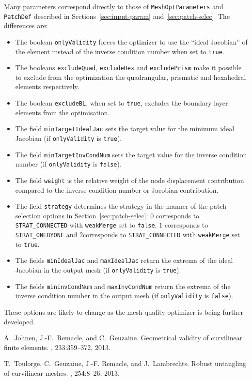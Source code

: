 \documentclass[12pt,a4paper,a4wide]{article}
\begin{document}
Many parameters correspond directly to those of
\texttt{MeshOptParameters} and \texttt{PatchDef} described in
Sections~\ref{sec:input-param} and~\ref{sec:patch-selec}. The
differences are:
\begin{itemize}
\item The boolean \texttt{onlyValidity} forces the optimizer to
use the ``ideal Jacobian'' of the element instead of the inverse
condition number when set to \texttt{true}.
\item The booleans \texttt{excludeQuad}, \texttt{excludeHex} and
\texttt{excludePrism} make it possible to exclude from the
optimization the quadrangular, prismatic and hexahedral elements
respectively.
\item The boolean \texttt{excludeBL}, when set to \texttt{true},
excludes the boundary layer elements from the optimisation.
\item The field \texttt{minTargetIdealJac} sets the target value
for the minimum ideal Jacobian (if \texttt{onlyValidity} is
\texttt{true}).
\item The field \texttt{minTargetInvCondNum} sets the target
value for the inverse condition number (if \texttt{onlyValidity}
is \texttt{false}).
\item The field \texttt{weight} is the relative weight of the node
displacement contribution compared to the inverse condition number
or Jacobian contribution.
\item The field \texttt{strategy} determines the strategy in the
manner of the patch selection options in
Section~\ref{sec:patch-selec}: $0$ corresponds to
\texttt{STRAT\_CONNECTED} with \texttt{weakMerge} set to
\texttt{false}, $1$ corresponds to \texttt{STRAT\_ONEBYONE}
and $2$corresponds to \texttt{STRAT\_CONNECTED} with
\texttt{weakMerge} set to \texttt{true}.
\item The fields \texttt{minIdealJac} and \texttt{maxIdealJac}
return the extrema of the ideal Jacobian in the output mesh
(if \texttt{onlyValidity} is \texttt{true}).
\item The fields \texttt{minInvCondNum} and
\texttt{maxInvCondNum} return the extrema of the inverse condition
number in the output mesh (if \texttt{onlyValidity} is
\texttt{false}).
\end{itemize}

These options are likely to change as the mesh quality optimizer
is being further developed.

%
%


\begin{thebibliography}{2}

A.~Johnen, J.-F.~Remacle, and C.~Geuzaine.
\newblock Geometrical validity of curvilinear finite elements.
, 233:359--372, 2013.

T.~Toulorge, C.~Geuzaine, J.-F. Remacle, and J.~Lambrechts.
\newblock Robust untangling of curvilinear meshes.
, 254:8--26, 2013.

\end{thebibliography}
\end{document}
